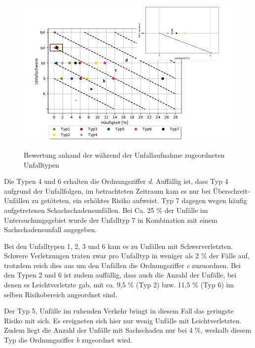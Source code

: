 \begin{savenotes}
	\begin{figure}[H]
		\centering
		\includegraphics[width=12cm,height=8cm]{figures/Bewertung_UT}
		\caption[Bewertung anhand der während der Unfallaufnahme zugeordneten Unfalltypen]{Bewertung anhand der während der Unfallaufnahme zugeordneten Unfalltypen}\label{fig:Bewertung_UT}
	\end{figure}
\end{savenotes}

Die Typen 4 und 6 erhalten die Ordnungsziffer \textit{d}. Auffällig ist, dass Typ 4 aufgrund der Unfallfolgen, im  betrachteten Zeitraum kam es nur bei Überschreit-Unfällen zu getöteten, ein erhöhtes Risiko aufweist. Typ 7 dagegen wegen häufig aufgetretenen Schachschadensunfällen. Bei Ca. 25 \% der Unfälle im Untersuchungsgebiet wurde der Unfalltyp 7 in Kombination mit einem Sachschadensunfall angegeben.

Bei den Unfalltypen 1, 2, 3 und 6 kam es zu Unfällen mit Schwerverletzten. Schwere Verletzungen traten zwar pro Unfalltyp in weniger als 2 \% der Fälle auf, trotzdem reich dies aus um den Unfällen die Ordnungsziffer \textit{c} zuzuordnen. Bei den Typen 2 und 6 ist zudem auffällig, dass auch die Anzahl der Unfälle, bei denen es Leichtverletzte gab, mit ca. 9,5 \% (Typ 2) bzw. 11,5 \% (Typ 6) im selben Risikobereich angeordnet sind.

Der Typ 5, Unfälle im ruhenden Verkehr bringt in diesem Fall das geringste Risiko mit sich. Es ereigneten sich hier nur wenig Unfälle mit Leichtverletzten. Zudem liegt die Anzahl der Unfälle mit Sachschaden nur bei 4 \%, weshalb diesem Typ die Ordnungsziffer \textit{b} zugeordnet wird.

